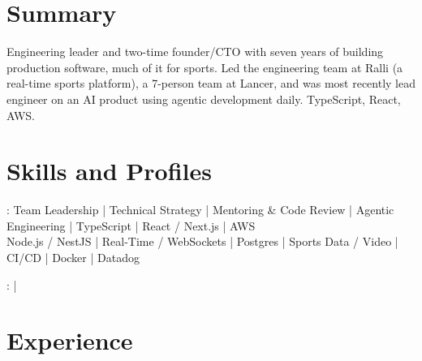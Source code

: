 \documentclass[print]{jack-resume}
\begin{document}
\pagecolor{darkmodeBackground}


\begin{minipage}[t][1cm][t]{.03\textwidth}
    \hfill
\end{minipage}

\section{Summary}
Engineering leader and two-time founder/CTO with seven years of building production software, much of it for sports. Led the engineering team at Ralli (a real-time sports platform), a 7-person team at Lancer, and was most recently lead engineer on an AI product using agentic development daily. TypeScript, React, AWS.
\sectionsep

\section{Skills and Profiles}
:
Team Leadership \hfill | \hfill
Technical Strategy \hfill | \hfill
Mentoring \& Code Review \hfill | \hfill
Agentic Engineering \hfill | \hfill
TypeScript \hfill | \hfill
React / Next.js \hfill | \hfill
AWS \\
\hspace{1.0cm} Node.js / NestJS \hfill | \hfill
Real-Time / WebSockets \hfill | \hfill
Postgres \hfill | \hfill
Sports Data / Video \hfill | \hfill
CI/CD \hfill | \hfill
Docker \hfill | \hfill
Datadog \\

\raggedright{
    :
      \href{https://www.linkedin.com/in/jack-sturtevant/}{ \ExternalLink} |
     \href{https://github.com/jacksturt}{ \ExternalLink}}

\section{Experience}
\end{document}
